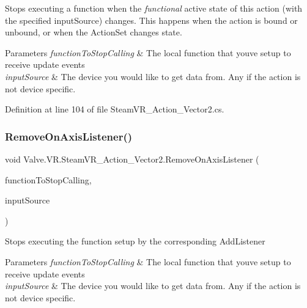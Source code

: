 Stops executing a function when the {\itshape functional} active state of this action (with the specified input\+Source) changes. This happens when the action is bound or unbound, or when the Action\+Set changes state. 


\begin{DoxyParams}{Parameters}
{\em function\+To\+Stop\+Calling} & The local function that you\textquotesingle{}ve setup to receive update events\\
\hline
{\em input\+Source} & The device you would like to get data from. Any if the action is not device specific.\\
\hline
\end{DoxyParams}


Definition at line 104 of file Steam\+V\+R\+\_\+\+Action\+\_\+\+Vector2.\+cs.

\mbox{\label{class_valve_1_1_v_r_1_1_steam_v_r___action___vector2_add5f9659d86eed956636d7495f4af7de}} 
\subsubsection{\texorpdfstring{RemoveOnAxisListener()}{RemoveOnAxisListener()}}
{\footnotesize\ttfamily void Valve.\+V\+R.\+Steam\+V\+R\+\_\+\+Action\+\_\+\+Vector2.\+Remove\+On\+Axis\+Listener (\begin{DoxyParamCaption}\item[{\mbox{\hyperlink{class_valve_1_1_v_r_1_1_steam_v_r___action___vector2_a11d8b99df804d185a33c7c60791ef426}{Axis\+Handler}}}]{function\+To\+Stop\+Calling,  }\item[{\mbox{\hyperlink{namespace_valve_1_1_v_r_a82e5bf501cc3aa155444ee3f0662853f}{Steam\+V\+R\+\_\+\+Input\+\_\+\+Sources}}}]{input\+Source }\end{DoxyParamCaption})}



Stops executing the function setup by the corresponding Add\+Listener 


\begin{DoxyParams}{Parameters}
{\em function\+To\+Stop\+Calling} & The local function that you\textquotesingle{}ve setup to receive update events\\
\hline
{\em input\+Source} & The device you would like to get data from. Any if the action is not device specific.\\
\hline
\end{DoxyParams}


